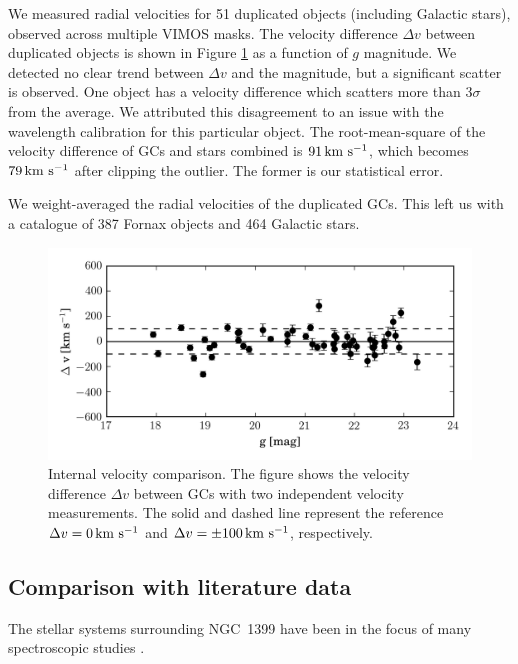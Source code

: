 \documentclass[usenatbib]{mnras}
\newcommand{\kms}{\mbox{\,km~s$^{-1}$}}
\begin{document}
We measured radial velocities for 51 duplicated objects (including Galactic
stars), observed across multiple VIMOS masks. The velocity difference $\Delta
v$ between duplicated objects is shown in Figure \ref{fig:internal} as a
function of $g$ magnitude. We detected no clear trend between $\Delta v$ and
the magnitude, but a significant scatter is observed. One object has a velocity
difference which scatters more than
3$\sigma$ from the average. We attributed this disagreement to an issue with
the wavelength calibration for this particular object. The root-mean-square of
the velocity difference of GCs and stars combined is $91 \kms$, which becomes
$79\kms$ after clipping the outlier. The former is our statistical error.

We weight-averaged the radial velocities of the duplicated GCs. This left us with a catalogue of 387
Fornax objects and 464 Galactic stars.

\begin{figure}
\centering
\includegraphics[width=\columnwidth]{figures/internal.png}
\caption{Internal velocity comparison. The figure shows the velocity difference
$\Delta v$ between GCs with two independent velocity measurements. The solid
and dashed line represent the reference $\Delta v = 0 \kms$ and
$\Delta v = \pm 100 \kms$, respectively. }
\label{fig:internal}
\end{figure}

\subsection{Comparison with literature data}\label{sec:compar}

The stellar systems surrounding NGC~1399 have been in the focus of many
spectroscopic studies
\citep{Dirsch04, Schuberth, Bergond07, Firth07, Chilingarian11, Mieske04,
Hilker07, Francis12, Drinkwater00}.
\end{document}
